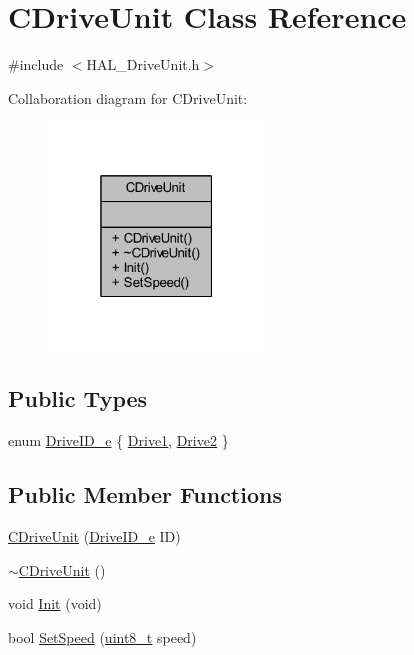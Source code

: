 \hypertarget{class_c_drive_unit}{}\section{C\+Drive\+Unit Class Reference}
\label{class_c_drive_unit}


{\ttfamily \#include $<$H\+A\+L\+\_\+\+Drive\+Unit.\+h$>$}



Collaboration diagram for C\+Drive\+Unit\+:
\nopagebreak
\begin{figure}[H]
\begin{center}
\leavevmode
\includegraphics[width=163pt]{class_c_drive_unit__coll__graph}
\end{center}
\end{figure}
\subsection*{Public Types}
\begin{DoxyCompactItemize}
\item 
enum \mbox{\hyperlink{class_c_drive_unit_a4edb3384824cee71b23c42025b689d4e}{Drive\+I\+D\+\_\+e}} \{ \mbox{\hyperlink{class_c_drive_unit_a4edb3384824cee71b23c42025b689d4ea5069438f822a5eb645aa78d8e4b461dd}{Drive1}}, 
\mbox{\hyperlink{class_c_drive_unit_a4edb3384824cee71b23c42025b689d4eaf18a8a2892d6497a0d3697e22848dfe0}{Drive2}}
 \}
\end{DoxyCompactItemize}
\subsection*{Public Member Functions}
\begin{DoxyCompactItemize}
\item 
\mbox{\hyperlink{class_c_drive_unit_aee1e28a6ee6956b8b2a01f09cfc102ee}{C\+Drive\+Unit}} (\mbox{\hyperlink{class_c_drive_unit_a4edb3384824cee71b23c42025b689d4e}{Drive\+I\+D\+\_\+e}} ID)
\item 
\mbox{\hyperlink{class_c_drive_unit_add2dcafc20d8e30ddc8ee2affb5085ee}{$\sim$\+C\+Drive\+Unit}} ()
\item 
void \mbox{\hyperlink{class_c_drive_unit_ab7b775c0f68db1490ecf8a726dbe786d}{Init}} (void)
\item 
bool \mbox{\hyperlink{class_c_drive_unit_a06ffeb71565bc8edabadae09157c705e}{Set\+Speed}} (\mbox{\hyperlink{_a_d_a_s___types_8h_aba7bc1797add20fe3efdf37ced1182c5}{uint8\+\_\+t}} speed)
\end{DoxyCompactItemize}


